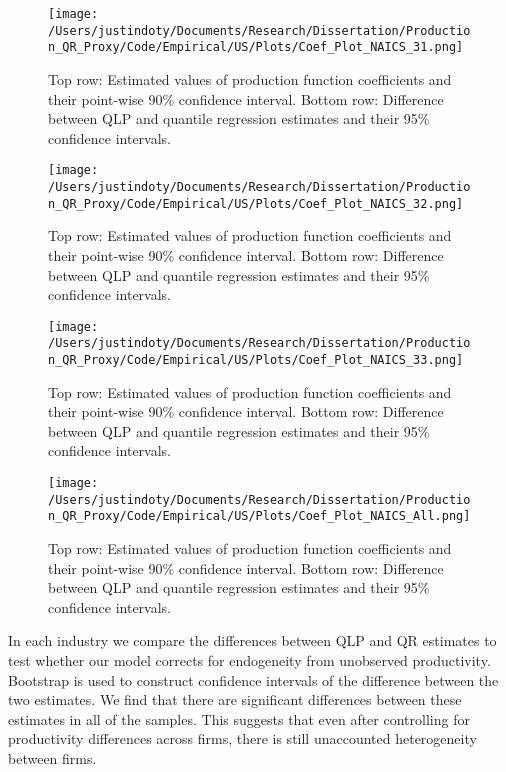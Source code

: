 \documentclass[11pt]{article}
\begin{document}

\label{Tab:USsummary}


\begin{figure}[H]
\centering
\texttt{[image: /Users/justindoty/Documents/Research/Dissertation/Production\_QR\_Proxy/Code/Empirical/US/Plots/Coef\_Plot\_NAICS\_31.png]}
\caption{Top row: Estimated values of production function coefficients and their point-wise 90\% confidence interval. Bottom row: Difference between QLP and quantile regression estimates and their 95\% confidence intervals.}
\label{fig:31coef}
\end{figure}

\begin{figure}[H]
\centering
\texttt{[image: /Users/justindoty/Documents/Research/Dissertation/Production\_QR\_Proxy/Code/Empirical/US/Plots/Coef\_Plot\_NAICS\_32.png]}
\caption{Top row: Estimated values of production function coefficients and their point-wise 90\% confidence interval. Bottom row: Difference between QLP and quantile regression estimates and their 95\% confidence intervals.}
\label{fig:32coef}
\end{figure}

\begin{figure}[H]
\centering
\texttt{[image: /Users/justindoty/Documents/Research/Dissertation/Production\_QR\_Proxy/Code/Empirical/US/Plots/Coef\_Plot\_NAICS\_33.png]}
\caption{Top row: Estimated values of production function coefficients and their point-wise 90\% confidence interval. Bottom row: Difference between QLP and quantile regression estimates and their 95\% confidence intervals.}
\label{fig:33coef}
\end{figure}

\begin{figure}[H]
\centering
\texttt{[image: /Users/justindoty/Documents/Research/Dissertation/Production\_QR\_Proxy/Code/Empirical/US/Plots/Coef\_Plot\_NAICS\_All.png]}
\caption{Top row: Estimated values of production function coefficients and their point-wise 90\% confidence interval. Bottom row: Difference between QLP and quantile regression estimates and their 95\% confidence intervals.}
\label{fig:USallcoef}
\end{figure}

In each industry we compare the differences between QLP and QR estimates to test whether our model corrects for endogeneity from unobserved productivity. Bootstrap is used to construct confidence intervals of the difference between the two estimates. We find that there are significant differences between these estimates in all of the samples. This suggests that even after controlling for productivity differences across firms, there is still unaccounted heterogeneity between firms.
\end{document}
